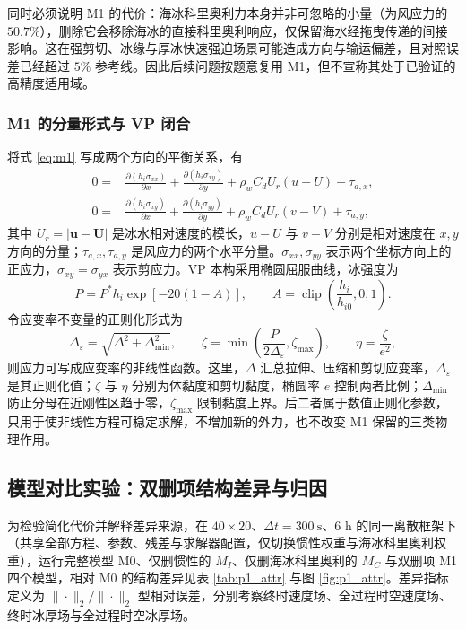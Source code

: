 \documentclass[UTF8]{ctexart}
\newcommand{\vect}[1]{\boldsymbol{#1}}
\begin{document}
同时必须说明 M1 的代价：海冰科里奥利力本身并非可忽略的小量（为风应力的 $50.7\%$），删除它会移除海冰的直接科里奥利响应，仅保留海水经拖曳传递的间接影响。这在强剪切、冰缘与厚冰快速强迫场景可能造成方向与输运偏差，且对照误差已经超过 $5\%$ 参考线。因此后续问题按题意复用 M1，但不宣称其处于已验证的高精度适用域。

\subsubsection{M1 的分量形式与 VP 闭合}

将式 \eqref{eq:m1} 写成两个方向的平衡关系，有
\begin{align}
0={}&\frac{\partial(h_i\sigma_{xx})}{\partial x}
+\frac{\partial(h_i\sigma_{xy})}{\partial y}
+\rho_wC_dU_r(u-U)+\tau_{a,x},\\
0={}&\frac{\partial(h_i\sigma_{xy})}{\partial x}
+\frac{\partial(h_i\sigma_{yy})}{\partial y}
+\rho_wC_dU_r(v-V)+\tau_{a,y},
\end{align}
其中 $U_r=|\vect u-\vect U|$ 是冰水相对速度的模长，$u-U$ 与 $v-V$ 分别是相对速度在 $x,y$ 方向的分量；$\tau_{a,x},\tau_{a,y}$ 是风应力的两个水平分量。$\sigma_{xx},\sigma_{yy}$ 表示两个坐标方向上的正应力，$\sigma_{xy}=\sigma_{yx}$ 表示剪应力。VP 本构采用椭圆屈服曲线，冰强度为
\begin{equation}
P=P^*h_i\exp[-20(1-A)],
\qquad
A=\operatorname{clip}\left(\frac{h_i}{h_{i0}},0,1\right).
\end{equation}
令应变率不变量的正则化形式为
\begin{equation}
\Delta_\varepsilon=\sqrt{\Delta^2+\Delta_{\min}^2},
\qquad
\zeta=\min\left(\frac{P}{2\Delta_\varepsilon},\zeta_{\max}\right),
\qquad
\eta=\frac{\zeta}{e^2},
\end{equation}
则应力可写成应变率的非线性函数。这里，$\Delta$ 汇总拉伸、压缩和剪切应变率，$\Delta_\varepsilon$ 是其正则化值；$\zeta$ 与 $\eta$ 分别为体黏度和剪切黏度，椭圆率 $e$ 控制两者比例；$\Delta_{\min}$ 防止分母在近刚性区趋于零，$\zeta_{\max}$ 限制黏度上界。后二者属于数值正则化参数，只用于使非线性方程可稳定求解，不增加新的外力，也不改变 M1 保留的三类物理作用。

\subsection{模型对比实验：双删项结构差异与归因}

为检验简化代价并解释差异来源，在 $40\times20$、$\Delta t=300\ \mathrm s$、6 h 的同一离散框架下（共享全部方程、参数、残差与求解器配置，仅切换惯性权重与海冰科里奥利权重），运行完整模型 M0、仅删惯性的 $M_I$、仅删海冰科里奥利的 $M_C$ 与双删项 M1 四个模型，相对 M0 的结构差异见表 \ref{tab:p1_attr} 与图 \ref{fig:p1_attr}。差异指标定义为 $\|\cdot\|_2/\|\cdot\|_2$ 型相对误差，分别考察终时速度场、全过程时空速度场、终时冰厚场与全过程时空冰厚场。
\end{document}
